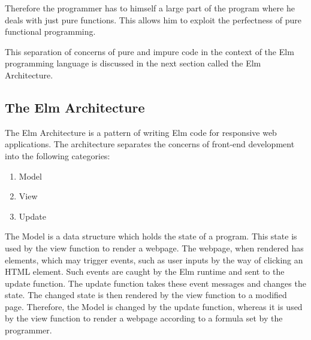 Therefore the programmer has to himself a large part of the program where he
deals with just pure functions. This allows him to exploit the perfectness of
pure functional programming.

This separation of concerns of pure and impure code in the context of the Elm
programming language is discussed in the next section called the Elm
Architecture.

\subsection{The Elm Architecture}
The Elm Architecture is a pattern of writing Elm code for responsive web applications. 
The architecture separates the concerns of front-end development into the following categories:

\begin{enumerate}
\item Model
\item View
\item Update
\end{enumerate}

The Model is a data structure which holds the state of a program. This state is
used by the view function to render a webpage. The webpage, when rendered has
elements, which may trigger events, such as user inputs by the way of clicking
an HTML element. Such events are caught by the Elm runtime and sent to the update
function.  The update function takes these event messages and changes the
state. The changed state is then rendered by the view function to a modified
page.  Therefore, the Model is changed by the update function, whereas it is
used by the view function to render a webpage according to a formula set by the
programmer.

